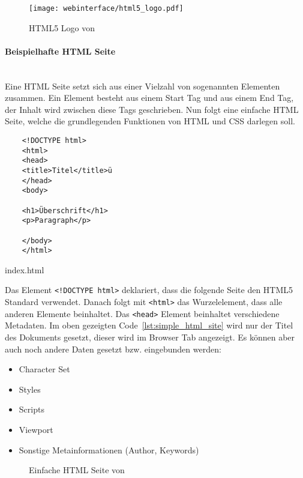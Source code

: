 \begin{figure}[H]
  \centering
  \texttt{[image: webinterface/html5\_logo.pdf]}
  \caption{HTML5 Logo von }
\end{figure}

\paragraph{Beispielhafte HTML Seite}\mbox{}\\
Eine \acs*{HTML} Seite setzt sich aus einer Vielzahl von sogenannten Elementen
zusammen. Ein Element besteht aus einem Start Tag und aus einem End Tag, der
Inhalt wird zwischen diese Tags geschrieben. Nun folgt eine einfache HTML Seite,
welche die grundlegenden Funktionen von HTML und CSS darlegen soll.

\begin{listing}[H]
  \begin{verbatim}
    <!DOCTYPE html>
    <html>
    <head>
    <title>Titel</title>ü
    </head>
    <body>

    <h1>Überschrift</h1>
    <p>Paragraph</p>

    </body>
    </html>
  \end{verbatim}
  \caption{index.html}
  \label{lst:simple_html_site}
\end{listing}

Das Element \verb|<!DOCTYPE html>| deklariert, dass die folgende Seite den HTML5
Standard verwendet. Danach folgt mit \verb|<html>| das Wurzelelement, dass alle
anderen Elemente beinhaltet. Das \verb|<head>| Element beinhaltet verschiedene
Metadaten. Im oben gezeigten Code~\ref{lst:simple_html_site} wird nur der Titel
des Dokuments gesetzt, dieser wird im Browser Tab angezeigt. Es können aber auch
noch andere Daten gesetzt bzw. eingebunden werden:

\begin{itemize}
  \item Character Set
  \item Styles
  \item Scripts
  \item Viewport
  \item Sonstige Metainformationen (Author, Keywords)
\end{itemize}

\begin{figure}[H]
  \centering
  \caption{Einfache HTML Seite von }
\end{figure}

